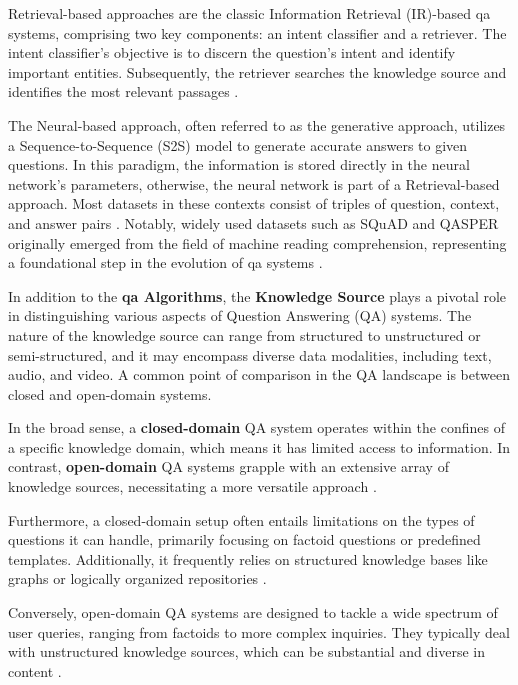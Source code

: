 Retrieval-based approaches are the classic Information Retrieval (IR)-based \gls{qa} systems, comprising two key components: an intent classifier and a retriever. The intent classifier's objective is to discern the question's intent and identify important entities. Subsequently, the retriever searches the knowledge source and identifies the most relevant passages \cite{farea_evaluation_2022, zhu_retrieving_2021}.

The Neural-based approach, often referred to as the generative approach, utilizes a Sequence-to-Sequence (S2S) model to generate accurate answers to given questions. In this paradigm, the information is stored directly in the neural network's parameters, otherwise, the neural network is part of a Retrieval-based approach. Most datasets in these contexts consist of triples of question, context, and answer pairs \cite{jurafsky_speech_2023}. Notably, widely used datasets such as SQuAD and QASPER originally emerged from the field of machine reading comprehension, representing a foundational step in the evolution of \gls{qa} systems \cite{rajpurkar_squad_2016, dasigi_dataset_2021, zhu_retrieving_2021}.

In addition to the \textbf{\gls{qa} Algorithms}, the \textbf{Knowledge Source} plays a pivotal role in distinguishing various aspects of Question Answering (QA) systems. The nature of the knowledge source can range from structured to unstructured or semi-structured, and it may encompass diverse data modalities, including text, audio, and video. A common point of comparison in the QA landscape is between closed and open-domain systems.

In the broad sense, a \textbf{closed-domain} QA system operates within the confines of a specific knowledge domain, which means it has limited access to information. In contrast, \textbf{open-domain} QA systems grapple with an extensive array of knowledge sources, necessitating a more versatile approach \cite{farea_evaluation_2022}.

Furthermore, a closed-domain setup often entails limitations on the types of questions it can handle, primarily focusing on factoid questions or predefined templates. Additionally, it frequently relies on structured knowledge bases like graphs or logically organized repositories \cite{hao_recent_2022}.

Conversely, open-domain QA systems are designed to tackle a wide spectrum of user queries, ranging from factoids to more complex inquiries. They typically deal with unstructured knowledge sources, which can be substantial and diverse in content \cite{zhu_retrieving_2021, farea_evaluation_2022, jurafsky_speech_2023}.

